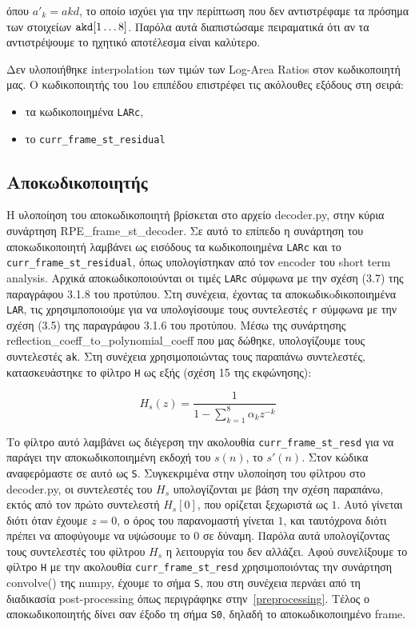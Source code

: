 \documentclass{article}
\begin{document}
όπου $a'_k = akd$, το οποίο ισχύει για την περίπτωση που δεν αντιστρέφαμε
τα πρόσημα των στοιχείων $\verb|akd|[1\ldots8]$. Παρόλα αυτά διαπιστώσαμε
πειραματικά ότι αν τα αντιστρέψουμε το ηχητικό αποτέλεσμα είναι καλύτερο.

Δεν υλοποιήθηκε interpolation των τιμών των Log-Area Ratios στον κωδικοποιητή μας.
Ο κωδικοποιητής του 1ου επιπέδου επιστρέφει τις ακόλουθες εξόδους στη σειρά:
\begin{itemize}
    \item τα κωδικοποιημένα \verb|LARc|,
    \item το \verb|curr_frame_st_residual|
\end{itemize}


\subsection{Αποκωδικοποιητής}


Η υλοποίηση του αποκωδικοποιητή βρίσκεται στο αρχείο 
decoder.py, στην κύρια συνάρτηση RPE\_frame\_st\_decoder.
Σε αυτό το επίπεδο η συνάρτηση του αποκωδικοποιητή λαμβάνει ως εισόδους τα
κωδικοποιημένα \verb|LARc| και το \verb|curr_frame_st_residual|,
όπως υπολογίστηκαν από τον encoder του short term analysis.
Αρχικά αποκωδικοποιούνται οι τιμές \verb|LARc| σύμφωνα με την 
σχέση (3.7) της παραγράφου 3.1.8 του προτύπου.
Στη συνέχεια, έχοντας τα αποκωδικoδικοποιημένα \verb|LAR|,
τις χρησιμποποιούμε για να υπολογίσουμε τους συντελεστές \verb|r| 
σύμφωνα με την σχέση (3.5) της παραγράφου 3.1.6 του προτύπου.
Μέσω της συνάρτησης reflection\_coeff\_to\_polynomial\_coeff που μας δώθηκε, 
υπολογίζουμε τους συντελεστές \verb|ak|. Στη συνέχεια χρησιμοποιώντας 
τους παραπάνω συντελεστές, κατασκευάστηκε το φίλτρο \verb|H| ως εξής (σχέση 15 της εκφώνησης):

\begin{equation}
    H_s(z) = \frac{1}{1 - \sum_{k=1}^8 \alpha_k z^{-k}}
\end{equation}

Το φίλτρο αυτό λαμβάνει ως διέγερση την ακολουθία \verb|curr_frame_st_resd|
για να παράγει την αποκωδικοποιημένη εκδοχή του $s(n)$, το $s'(n)$. Στον
κώδικα αναφερόμαστε σε αυτό ως \verb|S|.  Συγκεκριμένα στην υλοποίηση
του φίλτρου στο decoder.py, οι συντελεστές του $H_s$ υπολογίζονται με
βάση την σχέση παραπάνω, εκτός από τον πρώτο συντελεστή $H_s[0]$, που
ορίζεται ξεχωριστά ως $1$. Αυτό γίνεται διότι όταν έχουμε $z=0$, ο
όρος του παρανομαστή γίνεται $1$, και ταυτόχρονα διότι πρέπει να
αποφύγουμε να υψώσουμε το $0$ σε δύναμη. Παρόλα αυτά
υπολογίζοντας τους συντελεστές του φίλτρου $H_s$ η λειτουργία
του δεν αλλάζει. Αφού συνελίξουμε το φίλτρο \verb|H| με την ακολουθία
\verb|curr_frame_st_resd| χρησιμοποιόντας την συνάρτηση convolve() της numpy, έχουμε
το σήμα \verb|S|, που στη συνέχεια περνάει από τη διαδικασία post-processing
όπως περιγράφηκε στην~\autoref{preprocessing}. Τέλος ο αποκωδικοποιητής
δίνει σαν έξοδο τη σήμα \verb|S0|, δηλαδή το αποκωδικοποιημένο frame.
\end{document}
